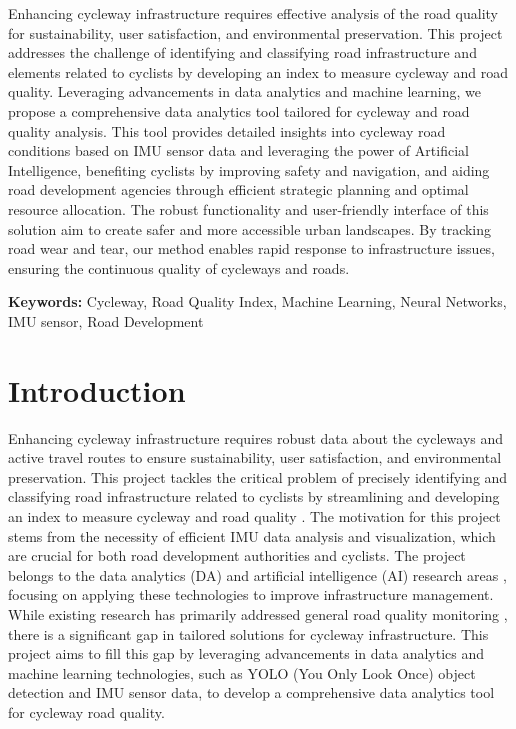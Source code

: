 \documentclass[a4paper,12pt]{Classes/RoboticsLaTeX}
\begin{document}
	
	\begin{abstracts}
		Enhancing cycleway infrastructure requires effective analysis of the road quality for sustainability, user satisfaction, and environmental preservation. This project addresses the challenge of identifying and classifying road infrastructure and elements related to cyclists by developing an index to measure cycleway and road quality. Leveraging advancements in data analytics and machine learning, we propose a comprehensive data analytics tool tailored for cycleway and road quality analysis. This tool provides detailed insights into cycleway road conditions based on IMU sensor data and leveraging the power of Artificial Intelligence, benefiting cyclists by improving safety and navigation, and aiding road development agencies through efficient strategic planning and optimal resource allocation. The robust functionality and user-friendly interface of this solution aim to create safer and more accessible urban landscapes. By tracking road wear and tear, our method enables rapid response to infrastructure issues, ensuring the continuous quality of cycleways and roads.
		
		\textbf{Keywords: } Cycleway, Road Quality Index, Machine Learning, Neural Networks, IMU sensor, Road Development 
	
	
	\tableofcontents
	\listoffigures
	\listoftables
	\printglossary[title=List of Acronyms,type=\acronymtype]
		
	
	\mainmatter
	
	
	\chapter{Introduction}
	\label{chap:introduction}
	
Enhancing cycleway infrastructure requires robust data about the cycleways and active travel routes to ensure sustainability, user satisfaction, and environmental preservation. This project tackles the critical problem of precisely identifying and classifying road infrastructure related to cyclists by streamlining and developing an index to measure cycleway and road quality \cite{Qureshi}. The motivation for this project stems from the necessity of efficient IMU data analysis and visualization, which are crucial for both road development authorities and cyclists. The project belongs to the data analytics (DA) and artificial intelligence (AI) research areas \cite{Ranyal}, focusing on applying these technologies to improve infrastructure management. While existing research has primarily addressed general road quality monitoring \cite{Mahlberg}, there is a significant gap in tailored solutions for cycleway infrastructure. This project aims to fill this gap by leveraging advancements in data analytics and machine learning technologies, such as YOLO (You Only Look Once) object detection and IMU sensor data, to develop a comprehensive data analytics tool for cycleway road quality.


\end{abstracts}
\end{document}
